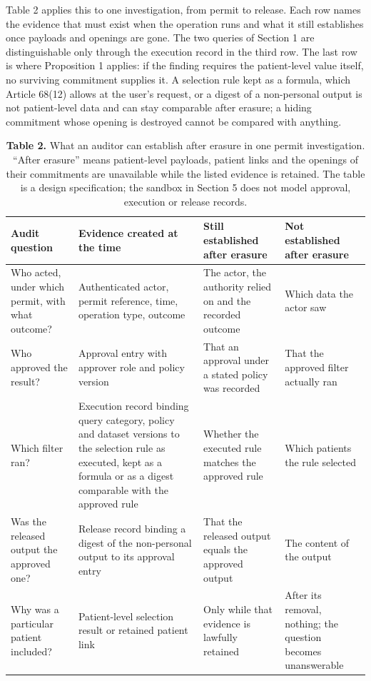 \documentclass[preprint,review,12pt]{elsarticle}
\begin{document}
Table 2 applies this to one investigation, from permit to release. Each
row names the evidence that must exist when the operation runs and what
it still establishes once payloads and openings are gone. The two
queries of Section 1 are distinguishable only through the execution
record in the third row. The last row is where Proposition 1 applies: if
the finding requires the patient-level value itself, no surviving
commitment supplies it. A selection rule kept as a formula, which
Article 68(12) allows at the user's request, or a digest of a
non-personal output is not patient-level data and can stay comparable
after erasure; a hiding commitment whose opening is destroyed cannot be
compared with anything.

\begin{table}[!tbp]
\captionsetup{justification=raggedright,singlelinecheck=false}
\caption*{\textbf{Table 2.} What an auditor can establish after erasure in one
permit investigation. ``After erasure'' means patient-level payloads,
patient links and the openings of their commitments are unavailable
while the listed evidence is retained. The table is a design
specification; the sandbox in Section 5 does not model approval,
execution or release records.}
\small
\begin{tabularx}{\textwidth}{>{\raggedright\arraybackslash}X>{\raggedright\arraybackslash}X>{\raggedright\arraybackslash}X>{\raggedright\arraybackslash}X}
\toprule
\textbf{Audit question} & \textbf{Evidence created at the time} & \textbf{Still established after erasure} & \textbf{Not established after erasure} \\
\midrule
Who acted, under which permit, with what outcome? & Authenticated actor, permit reference, time, operation type, outcome & The actor, the authority relied on and the recorded outcome & Which data the actor saw \\
Who approved the result? & Approval entry with approver role and policy version & That an approval under a stated policy was recorded & That the approved filter actually ran \\
Which filter ran? & Execution record binding query category, policy and dataset versions to the selection rule as executed, kept as a formula or as a digest comparable with the approved rule & Whether the executed rule matches the approved rule & Which patients the rule selected \\
Was the released output the approved one? & Release record binding a digest of the non-personal output to its approval entry & That the released output equals the approved output & The content of the output \\
Why was a particular patient included? & Patient-level selection result or retained patient link & Only while that evidence is lawfully retained & After its removal, nothing; the question becomes unanswerable \\
\bottomrule
\end{tabularx}
\end{table}
\end{document}
